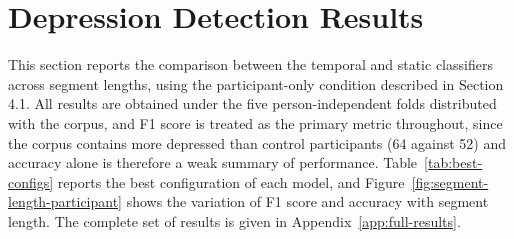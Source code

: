 \documentclass{mproj}
\begin{document}
\section{Depression Detection Results}\label{sec:detection-results}

This section reports the comparison between the temporal and static classifiers across segment lengths, using the participant-only condition described in Section 4.1. All results are obtained under the five person-independent folds distributed with the corpus, and F1 score is treated as the primary metric throughout, since the corpus contains more depressed than control participants (64 against 52) and accuracy alone is therefore a weak summary of performance. Table~\ref{tab:best-configs} reports the best configuration of each model, and Figure~\ref{fig:segment-length-participant} shows the variation of F1 score and accuracy with segment length. The complete set of results is given in Appendix~\ref{app:full-results}.
\end{document}
